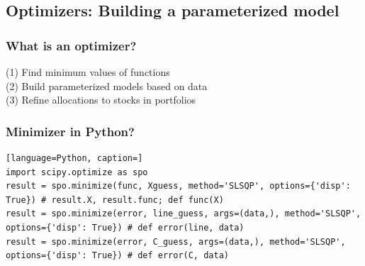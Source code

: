 \documentclass[12pt]{article}
\begin{document}
\subsection{Optimizers: Building a parameterized model}

\subsubsection{What is an optimizer?} 

(1) Find minimum values of functions \\
(2) Build parameterized models based on data \\
(3) Refine allocations to stocks in portfolios 

\subsubsection{Minimizer in Python?} 

\begin{lstlisting}[language=Python, caption=]
import scipy.optimize as spo
result = spo.minimize(func, Xguess, method='SLSQP', options={'disp': True}) # result.X, result.func; def func(X)
result = spo.minimize(error, line_guess, args=(data,), method='SLSQP', options={'disp': True}) # def error(line, data)
result = spo.minimize(error, C_guess, args=(data,), method='SLSQP', options={'disp': True}) # def error(C, data)
\end{lstlisting}
\end{document}
